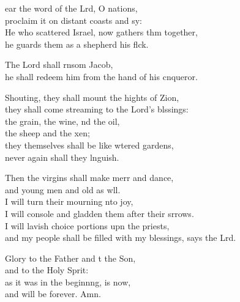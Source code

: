 \begin{psalmverse}
  \begin{patverse}
    ear the word of the Lrd, O nations,\Med\\
proclaim it on distant coasts and sy:\\
He who scattered Israel, now gathers thm together,\Med\\
he guards them as a shepherd his flck.

The Lord shall rnsom Jacob,\Med\\
he shall redeem him from the hand of his cnqueror.

Shouting, they shall mount the hights of Zion,\Med\\
they shall come streaming to the Lord’s blssings:\\
the grain, the wine, nd the oil,\Med\\
the sheep and the xen;\\
they themselves shall be like wtered gardens,\Med\\
never again shall they lnguish.

Then the virgins shall make merr and dance,\Med\\
and young men and old as wll.\\
I will turn their mourning \pointup{\i}nto joy,\Med\\
I will console and gladden them after their srrows.\\
I will lavish choice portions upn the priests,\Med\\
and my people shall be filled with my blessings, says the Lrd.

Glory to the Father and t the Son,\Med\\
and to the Holy Sp\pointup{\i}rit:\\
as it was in the beginn\pointup{\i}ng, is now,\Med\\
and will be forever. Amn. 
  \end{patverse}
\end{psalmverse}
